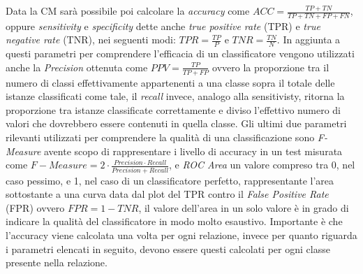 Data la CM sarà possibile poi calcolare la \label{formula:accuracy}\emph{accuracy} come $ACC = \frac{TP+TN}{TP+TN+FP+FN}$, oppure \label{formula:sensitivity}\emph{sensitivity} e \label{formula:specificity}\emph{specificity} dette anche \emph{true positive rate} (TPR) e \emph{true negative rate} (TNR), nei seguenti modi: $TPR = \frac{TP}{P}$  e $TNR = \frac{TN}{N}$. In aggiunta a questi parametri per comprendere l'efficacia di un classificatore vengono utilizzati anche la \emph{Precision} ottenuta come $PPV=\frac{TP}{TP+FP}$ ovvero la proporzione tra il numero di classi effettivamente appartenenti a una classe sopra il totale delle istanze classificati come tale, il \emph{recall} invece, analogo alla sensitivisty, ritorna la proporzione tra istanze classificate correttamente e diviso l'effettivo numero di valori che dovrebbero essere contenuti in quella classe. Gli ultimi due parametri rilevanti utilizzati per comprendere la qualità di una classificazione sono \emph{F-Measure} avente scopo di rappresentare i livello di accuracy in un test misurata come $ F-Measure = 2\cdot \frac{Precision \cdot Recall}{Precision+Recall}$, e \emph{ROC Area} un valore compreso tra 0, nel caso pessimo, e 1, nel caso di un classificatore perfetto, rappresentante l'area sottostante a una curva data dal plot del TPR contro il \emph{False Positive Rate} (FPR) ovvero $FPR = 1 - TNR$, il valore dell'area in un solo valore è in grado di indicare la qualità del classificatore in modo molto esaustivo.\label{formula:all} Importante è che l'accuracy viene calcolata una volta per ogni relazione, invece per quanto riguarda i parametri elencati in seguito, devono essere questi calcolati per ogni classe presente nella relazione.
